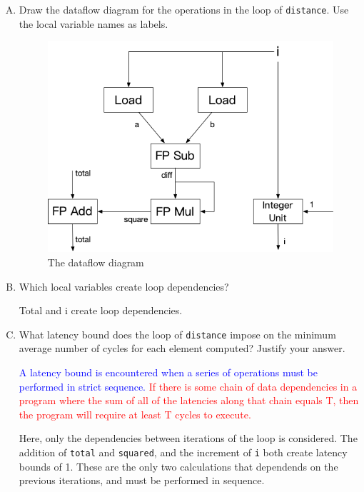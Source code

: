 \documentclass[11pt]{article}
\newenvironment{choice}{\begin{enumerate}[A.]}{\end{enumerate}}
\newenvironment{answer}{\begin{minipage}[c][1.5in]{\textwidth}}{\end{minipage}}
\begin{document}
\begin{choice}
\item
Draw the dataflow diagram for the operations in the loop of \lstinline{distance}.  Use the local variable names as labels.

\begin{figure}[h!]
  \centering
  \includegraphics*[width=0.6\linewidth]{1.A.png}
  \caption[]{The dataflow diagram}
\end{figure}

\newpage
\item
Which local variables create loop dependencies?

\begin{answer}

Total and i create loop dependencies. 

\end{answer}

\item

What latency bound does the loop of \lstinline{distance} impose on the minimum average number of cycles for each element computed?
Justify your answer.

\begin{answer}
\textcolor{blue}{A latency bound is encountered when a series of operations must be performed in strict sequence.}
\textcolor{red}{If there is some chain of data dependencies in a program where the sum of all of the latencies along that chain equals T, then the program will require at least T cycles to execute.}

Here, only the dependencies between iterations of the loop is considered. 
The addition of \lstinline{total} and \lstinline{squared}, and the increment of \lstinline{i} both create latency bounds of 1. These are the 
only two calculations that dependends on the previous iterations, and must be performed in sequence. 


\end{answer}
\end{choice}
\end{document}
